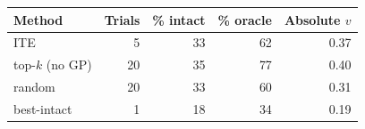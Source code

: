 \begin{tabular}{lrrrr}
\toprule
Method & Trials & \% intact & \% oracle & Absolute $v$ \\
\midrule
ITE & 5 & 33 & 62 & 0.37 \\
top-$k$ (no GP) & 20 & 35 & 77 & 0.40 \\
random & 20 & 33 & 60 & 0.31 \\
best-intact & 1 & 18 & 34 & 0.19 \\
\bottomrule
\end{tabular}
